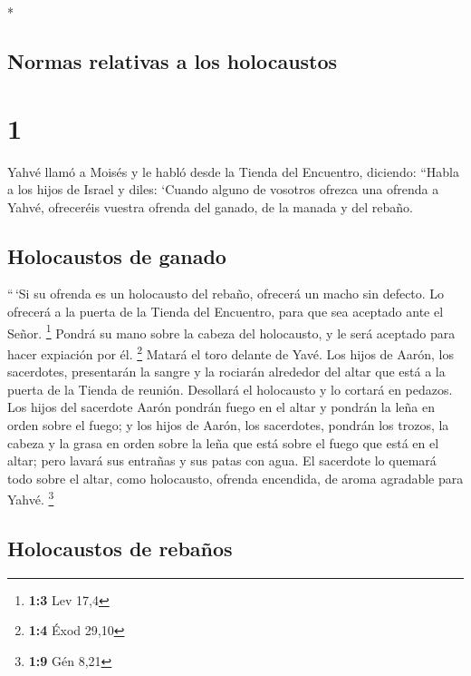 \begin{paracol}{2} \switchcolumn[0]*

\hypertarget{normas-relativas-a-los-holocaustos}{%
\subsection{Normas relativas a los
holocaustos}\label{normas-relativas-a-los-holocaustos}}

\hypertarget{section}{%
\section{1}\label{section}}

 Yahvé llamó a Moisés y le habló desde la Tienda del
Encuentro, diciendo:  ``Habla a los hijos de Israel y
diles: `Cuando alguno de vosotros ofrezca una ofrenda a Yahvé,
ofreceréis vuestra ofrenda del ganado, de la manada y del rebaño.

\hypertarget{holocaustos-de-ganado}{%
\subsection{Holocaustos de ganado}\label{holocaustos-de-ganado}}

 ``\,`Si su ofrenda es un holocausto del rebaño, ofrecerá
un macho sin defecto. Lo ofrecerá a la puerta de la Tienda del
Encuentro, para que sea aceptado ante el Señor. \footnote{\textbf{1:3}
  Lev 17,4}  Pondrá su mano sobre la cabeza del
holocausto, y le será aceptado para hacer expiación por él. \footnote{\textbf{1:4}
  Éxod 29,10}  Matará el toro delante de Yavé. Los hijos
de Aarón, los sacerdotes, presentarán la sangre y la rociarán alrededor
del altar que está a la puerta de la Tienda de reunión. 
Desollará el holocausto y lo cortará en pedazos.  Los
hijos del sacerdote Aarón pondrán fuego en el altar y pondrán la leña en
orden sobre el fuego;  y los hijos de Aarón, los
sacerdotes, pondrán los trozos, la cabeza y la grasa en orden sobre la
leña que está sobre el fuego que está en el altar;  pero
lavará sus entrañas y sus patas con agua. El sacerdote lo quemará todo
sobre el altar, como holocausto, ofrenda encendida, de aroma agradable
para Yahvé. \footnote{\textbf{1:9} Gén 8,21}

\hypertarget{holocaustos-de-rebauxf1os}{%
\subsection{Holocaustos de rebaños}\label{holocaustos-de-rebauxf1os}}


\end{paracol}
